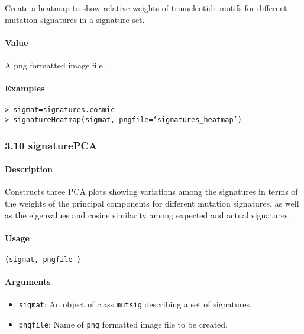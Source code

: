 \documentclass[]{article}
\providecommand{\tightlist}{%
  \setlength{\itemsep}{0pt}\setlength{\parskip}{0pt}}
\let\oldparagraph\paragraph
\renewcommand{\paragraph}[1]{\oldparagraph{#1}\mbox{}}
\begin{document}
Create a heatmap to show relative weights of trinucleotide motifs for
different mutation signatures in a signature-set.

\paragraph{\texorpdfstring{\textbf{Value}}{Value}}\label{value-6}

A png formatted image file.

\paragraph{\texorpdfstring{\textbf{Examples}}{Examples}}\label{examples-8}

\begin{verbatim}
> sigmat=signatures.cosmic
> signatureHeatmap(sigmat, pngfile=‘signatures_heatmap’)
\end{verbatim}

\subsubsection{3.10 signaturePCA}\label{signaturepca}

\paragraph{\texorpdfstring{\textbf{Description}}{Description}}\label{description-8}

Constructs three PCA plots showing variations among the signatures in
terms of the weights of the principal components for different mutation
signatures, as well as the eigenvalues and cosine similarity among
expected and actual signatures.

\paragraph{\texorpdfstring{\textbf{Usage}}{Usage}}\label{usage-9}

\texttt{(sigmat,\ pngfile\ )}

\paragraph{\texorpdfstring{\textbf{Arguments
}}{Arguments }}\label{arguments-8}

\begin{itemize}
\tightlist
\item
  \texttt{sigmat}: An object of class \texttt{mutsig} describing a set
  of signatures.
\item
  \texttt{pngfile}: Name of \texttt{png} formatted image file to be
  created.
\end{itemize}
\end{document}
